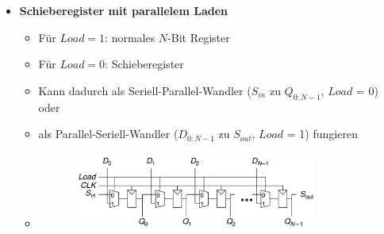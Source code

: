 \documentclass[11pt,a4paper]{article}
\begin{document}
\begin{itemize}
\item \textbf{Schieberegister mit parallelem Laden}
	\begin{itemize}
	\item Für $Load = 1$: normales $N$-Bit Register
	\item Für $Load = 0$: Schieberegister
	\item Kann dadurch als Seriell-Parallel-Wandler ($S_{in}$ zu $Q_{0:N-1}$, $Load$ = 0) oder
	\item als Parallel-Seriell-Wandler ($D_{0:N-1}$ zu $S_{out}$, $Load$ = 1) fungieren
	\item[]
		\begin{figure}[H]
		\begin{center}
		\includegraphics[height=2.5cm]{schieberegisterpara}
		\end{center}
		\end{figure}
	\end{itemize}
\end{itemize}
\end{document}
